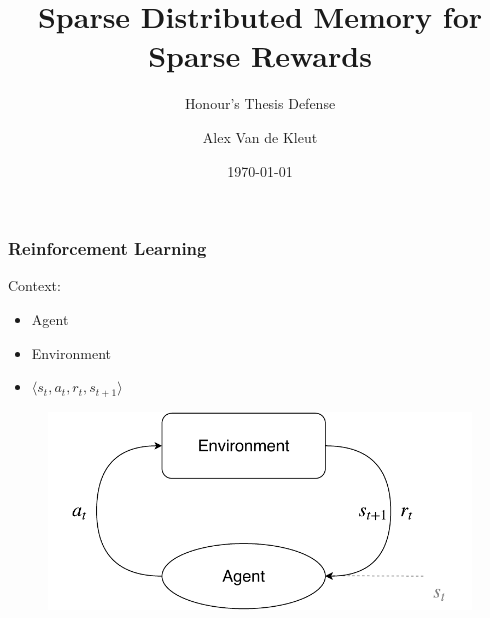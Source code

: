 \documentclass{beamer}
\title{Sparse Distributed Memory for Sparse Rewards}
\subtitle{Honour's Thesis Defense}
\author{Alex Van de Kleut}
\institute{Brock University}
\date{\today}
\begin{document}
\begin{frame}
  \titlepage
\end{frame}

\begin{frame}
  \frametitle{Reinforcement Learning}
  Context:
  \begin{itemize}
    \item Agent
    \item Environment
    \item $\langle s_t, a_t, r_t, s_{t+1} \rangle$
  \end{itemize}
  \begin{figure}
    \includegraphics[scale=0.5]{assets/rl.pdf}
  \end{figure}
\end{frame}
\end{document}
